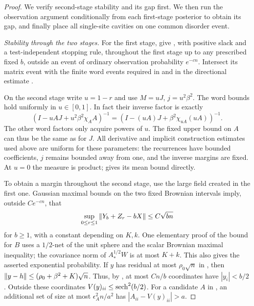 \begin{proof}
We verify second-stage stability and its gap first.  We then run the
observation argument conditionally from each first-stage posterior to
obtain its gap, and finally place all single-site cavities on one common
disorder event.

\emph{Stability through the two stages.}
For the first stage, \cite[Proposition~5.1 and Corollary~5.2]{SKGap} give
, with positive slack and a test-independent stopping
rule, throughout the first stage up to any prescribed fixed $b$, outside
an event of ordinary observation probability $e^{-cn}$.  Intersect its
matrix event with the finite word events required in
 and in the directional estimate
\cite[Proposition~7.2]{SKGap}.

On the second stage write $u=1-r$ and use $M=uJ$, $j=u^2\beta^2$.
The word bounds hold uniformly in $u\in[0,1]$.  In fact their inverse
factor is exactly
\[
 (I-uAJ+u^2\beta^2\chi_AA)^{-1}
   =(I-(uA)J+\beta^2\chi_{uA}(uA))^{-1}.
\]
The other word factors only acquire powers of $u$.  The fixed upper bound
on $A$ can thus be the same as for $J$.  All derivative and implicit
construction estimates used above are uniform for these parameters:
the recurrences have bounded coefficients, $j$ remains bounded away from
one, and the inverse margins are fixed.  At $u=0$ the measure is product;
 gives its mean bound directly.

To obtain a margin throughout the second stage, use the large field
created in the first one.  Gaussian
maximal bounds on the two fixed Brownian intervals imply, outside
$Ce^{-cn}$, that
\begin{equation}\label{eq:stat-large-field}
 \sup_{0\le r\le1}\left\lVert Y_b+Z_r-bX\right\rVert\le C\sqrt{bn}
\end{equation}
for $b\ge1$, with a constant depending on $K,k$.  One elementary proof of
the bound for $B$ uses a $1/2$-net of the unit sphere and the scalar
Brownian maximal inequality; the covariance norm of $A_*^{1/2}W$ is at
most $K+k$.  This also gives the asserted exponential probability.
If $y$ has residual at most $\rho_0\sqrt n$ in
, then
$\left\lVert y-h\right\rVert\le(\rho_0+\beta^2+K)\sqrt n$.
Thus, by , at most $C n/b$ coordinates have
$|y_i|<b/2$.  Outside these coordinates $V(y)_{ii}\le\operatorname{sech}^2(b/2)$.
For a candidate $A$ in , an additional set of size
at most $\epsilon_A^2n/a^2$ has $|A_{ii}-V(y)_{ii}|>a$.


\end{proof}
